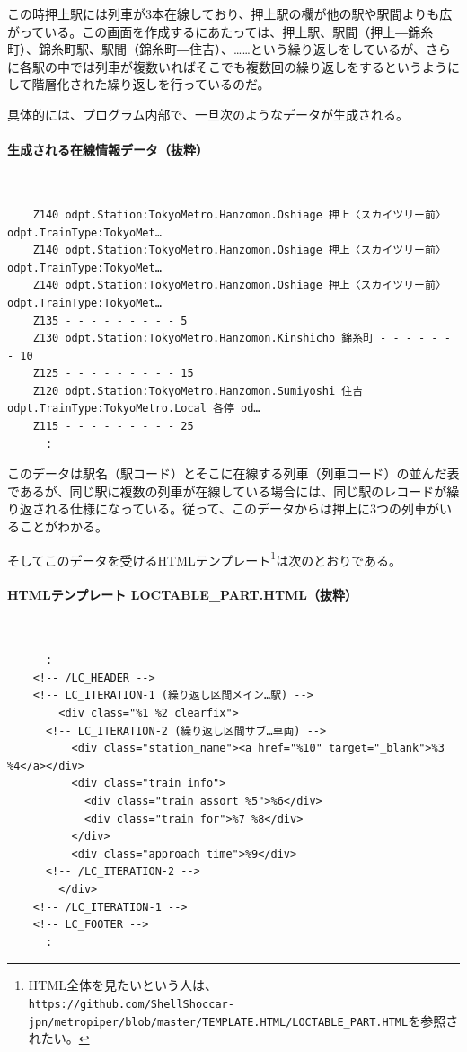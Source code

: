 この時押上駅には列車が3本在線しており、押上駅の欄が他の駅や駅間よりも広がっている。この画面を作成するにあたっては、押上駅、駅間（押上―錦糸町）、錦糸町駅、駅間（錦糸町―住吉）、……という繰り返しをしているが、さらに各駅の中では列車が複数いればそこでも複数回の繰り返しをするというようにして階層化された繰り返しを行っているのだ。

具体的には、プログラム内部で、一旦次のようなデータが生成される。
\paragraph*{生成される在線情報データ（抜粋）} 　\\
\begin{frameboxit}{160.0mm}
\begin{verbatim}
	Z140 odpt.Station:TokyoMetro.Hanzomon.Oshiage 押上〈スカイツリー前〉 odpt.TrainType:TokyoMet…
	Z140 odpt.Station:TokyoMetro.Hanzomon.Oshiage 押上〈スカイツリー前〉 odpt.TrainType:TokyoMet…
	Z140 odpt.Station:TokyoMetro.Hanzomon.Oshiage 押上〈スカイツリー前〉 odpt.TrainType:TokyoMet…
	Z135 - - - - - - - - - 5
	Z130 odpt.Station:TokyoMetro.Hanzomon.Kinshicho 錦糸町 - - - - - - - 10
	Z125 - - - - - - - - - 15
	Z120 odpt.Station:TokyoMetro.Hanzomon.Sumiyoshi 住吉 odpt.TrainType:TokyoMetro.Local 各停 od…
	Z115 - - - - - - - - - 25
	  :
\end{verbatim}
\end{frameboxit}
このデータは駅名（駅コード）とそこに在線する列車（列車コード）の並んだ表であるが、同じ駅に複数の列車が在線している場合には、同じ駅のレコードが繰り返される仕様になっている。従って、このデータからは押上に3つの列車がいることがわかる。

そしてこのデータを受けるHTMLテンプレート\footnote{HTML全体を見たいという人は、\\ \verb|https://github.com/ShellShoccar-jpn/metropiper/blob/master/TEMPLATE.HTML/LOCTABLE_PART.HTML|を参照されたい。}は次のとおりである。
\paragraph*{HTMLテンプレート LOCTABLE\_{}PART.HTML（抜粋）} 　\\
\begin{frameboxit}{160.0mm}
\begin{verbatim}
	  :
	<!-- /LC_HEADER -->
	<!-- LC_ITERATION-1 (繰り返し区間メイン…駅) -->
	    <div class="%1 %2 clearfix">
	  <!-- LC_ITERATION-2 (繰り返し区間サブ…車両) -->
	      <div class="station_name"><a href="%10" target="_blank">%3 %4</a></div>
	      <div class="train_info">
	        <div class="train_assort %5">%6</div>
	        <div class="train_for">%7 %8</div>
	      </div>
	      <div class="approach_time">%9</div>
	  <!-- /LC_ITERATION-2 -->
	    </div>
	<!-- /LC_ITERATION-1 -->
	<!-- LC_FOOTER -->
	  :
\end{verbatim}
\end{frameboxit}

